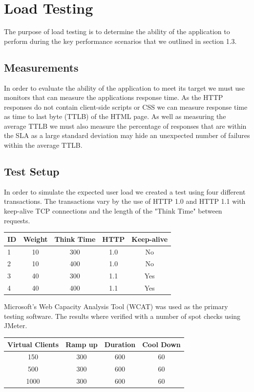\chapter{Load Testing}

The purpose of load testing is to determine the ability of the application to perform during the key performance scenarios that we outlined in section 1.3. 


\section{Measurements}
In order to evaluate the ability of the application to meet its target we must use monitors that can measure the applications response time. As the HTTP responses do not contain client-side scripts or CSS we can measure response time as time to last byte (TTLB) of the HTML page. As well as measuring the average TTLB we must also measure the percentage of responses that are within the SLA as a large standard deviation may hide an unexpected number of failures within the average TTLB.

\section{Test Setup}
In order to simulate the expected user load we created a test using four different transactions. The transactions vary by the use of HTTP 1.0 and HTTP 1.1 with keep-alive TCP connections and the length of the "Think Time" between requests.

\begin{center}
\begin{tabular}{|l | c | c | c | c |}
\hline
ID & Weight & Think Time & HTTP & Keep-alive \\
\hline
1 & 10 & 300 & 1.0 & No \\ 
2 & 10 & 400 & 1.0 & No \\ 
3 & 40 & 300 & 1.1 & Yes \\ 
4 & 40 & 400 & 1.1 & Yes \\
    \hline
\end{tabular}
\end{center}

Microsoft's Web Capacity Analysis Tool (WCAT) was used as the primary testing software. The results where verified with a number of spot checks using JMeter. 

\begin{center}
\begin{tabular}{| c | c | c | c |}
\hline
Virtual Clients & Ramp up & Duration & Cool Down \\
\hline
150 & 300 & 600 & 60 \\ 
500 & 300 & 600 & 60 \\ 
1000 & 300 & 600 & 60 \\ 
\hline
\end{tabular}
\end{center}

